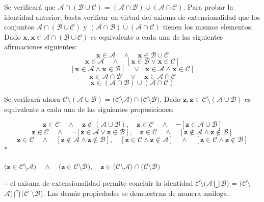 \begin{proof2}
Se verificará que  $\mathcal{A} \cap (\mathcal{B} \cup \mathcal{C}) = (\mathcal{A} \cap \mathcal{B}) \cup (\mathcal{A} \cap \mathcal{C})$. Para probar la identidad anterior,
basta verificar en virtud del axioma de extensionalidad que los conjuntos  $\mathcal{A} \cap (\mathcal{B} \cup \mathcal{C})$ y $(\mathcal{A} \cap \mathcal{B}) \cup (\mathcal{A} \cap \mathcal{C})$ tienen los mismos elementos. \\ 

Dado $\mathbf{x}, \mathbf{x} \in \mathcal{A} \cap (\mathcal{B} \cup \mathcal{C})$ es equivalente a cada una de las siguientes afirmaciones siguientes: 
	\[ \mathbf{x} \in \mathcal{A} \quad \wedge \quad \mathbf{x} \in \mathcal{B} \cup \mathcal{C} \]
	\[ \mathbf{x} \in \mathcal{A} \quad \wedge \quad [ \mathbf{x}\in\mathcal{B} \vee \mathbf{x}\in\mathcal{C}  ]\]
	\[ [\mathbf{x}\in\mathcal{A} \wedge \mathbf{x}\in\mathcal{B}] \quad \vee [\mathbf{x}\in\mathcal{A} \wedge \mathbf{x}\in\mathcal{C}]\]
	\[ \mathbf{x}\in\mathcal{A}\cap\mathcal{B} \quad \vee \quad \mathbf{x}\in\mathcal{A}\cap\mathcal{C}\]
	\[ \mathbf{x} \in (\mathcal{A}\cap\mathcal{B})\cup(\mathcal{A}\cap\mathcal{C})\]

Se verifcará ahora $\mathcal{C}$\textbackslash$(\mathcal{A}\cup\mathcal{B}) = (\mathcal{C}$\textbackslash$\mathcal{A})\cap(\mathcal{C}$\textbackslash$\mathcal{B})$. Dado $\mathbf{z}, \mathbf{z}\in\mathcal{C}$\textbackslash$(\mathcal{A}\cup\mathcal{B})$ es equivalente a cada una de las siguientes proposiciones: 

\[ \mathbf{z}\in\mathcal{C} \quad \wedge \quad \mathbf{z}\notin(\mathcal{A}\cup\mathcal{B}), \quad \mathbf{z}\in\mathcal{C} \quad \wedge \quad \neg[\mathbf{z}\in \mathcal{A}\cup\mathcal{B}]\]
\[\mathbf{z}\in\mathcal{C} \quad \wedge \quad \neg[\mathbf{z}\in\mathcal{A} \vee \mathbf{z}\in\mathcal{B}], \quad \mathbf{z}\in\mathcal{C} \quad \wedge\quad [\mathbf{z}\notin\mathcal{A} \wedge \mathbf{z}\notin\mathcal{B}]\]
\[\mathbf{z}\in\mathcal{C} \quad \wedge \quad [\mathbf{z}\notin\mathcal{A} \wedge \mathbf{z}\notin\mathcal{B}], \quad [\mathbf{z}\in\mathcal{C} \wedge \mathbf{z}\notin\mathcal{A}] \quad \wedge \quad [\mathbf{z}\in\mathcal{C}\wedge\mathbf{z}\notin\mathcal{B}]\] 
*\begin{centering}
	$(\mathbf{z}\in\mathcal{C}$\textbackslash$\mathcal{A})\quad\wedge\quad(\mathbf{z}\in\mathcal{C}$\textbackslash$\mathcal{B}), \quad \mathbf{z}\in(\mathcal{C}$\textbackslash$\mathcal{A})\cap(\mathcal{C}$\textbackslash$\mathcal{B})$\\
\end{centering}
$\therefore$ el axioma de extensionalidad permite concluir la identidad $\mathcal{C}$\textbackslash$(\mathcal{A} \bigcup \mathcal{B}$) = $(\mathcal{C}$\textbackslash$\mathcal{A}) \bigcap (\mathcal{C}$ \textbackslash $\mathcal{B})$. Las demás propiedades se demuestran de manera análoga. 
\end{proof2} 

